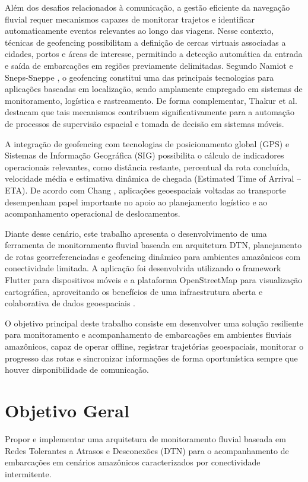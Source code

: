 \documentclass[12pt]{article}
\begin{document}
Além dos desafios relacionados à comunicação, a gestão eficiente da navegação fluvial requer mecanismos capazes de monitorar trajetos e identificar automaticamente eventos relevantes ao longo das viagens. Nesse contexto, técnicas de geofencing possibilitam a definição de cercas virtuais associadas a cidades, portos e áreas de interesse, permitindo a detecção automática da entrada e saída de embarcações em regiões previamente delimitadas. Segundo Namiot e Sneps-Sneppe \cite{namiot2013geofencing}, o geofencing constitui uma das principais tecnologias para aplicações baseadas em localização, sendo amplamente empregado em sistemas de monitoramento, logística e rastreamento. De forma complementar, Thakur et al. \cite{thakur2020geofencing} destacam que tais mecanismos contribuem significativamente para a automação de processos de supervisão espacial e tomada de decisão em sistemas móveis.

A integração de geofencing com tecnologias de posicionamento global (GPS) e Sistemas de Informação Geográfica (SIG) possibilita o cálculo de indicadores operacionais relevantes, como distância restante, percentual da rota concluída, velocidade média e estimativa dinâmica de chegada (Estimated Time of Arrival – ETA). De acordo com Chang \cite{chang2018gis}, aplicações geoespaciais voltadas ao transporte desempenham papel importante no apoio ao planejamento logístico e ao acompanhamento operacional de deslocamentos.

Diante desse cenário, este trabalho apresenta o desenvolvimento de uma ferramenta de monitoramento fluvial baseada em arquitetura DTN, planejamento de rotas georreferenciadas e geofencing dinâmico para ambientes amazônicos com conectividade limitada. A aplicação foi desenvolvida utilizando o framework Flutter para dispositivos móveis e a plataforma OpenStreetMap para visualização cartográfica, aproveitando os benefícios de uma infraestrutura aberta e colaborativa de dados geoespaciais \cite{openstreetmap}.

O objetivo principal deste trabalho consiste em desenvolver uma solução resiliente para monitoramento e acompanhamento de embarcações em ambientes fluviais amazônicos, capaz de operar offline, registrar trajetórias geoespaciais, monitorar o progresso das rotas e sincronizar informações de forma oportunística sempre que houver disponibilidade de comunicação.

\section{Objetivo Geral}
Propor e implementar uma arquitetura de monitoramento fluvial baseada em Redes Tolerantes a Atrasos e Desconexões (DTN) para o acompanhamento de embarcações em cenários amazônicos caracterizados por conectividade intermitente.
\end{document}

